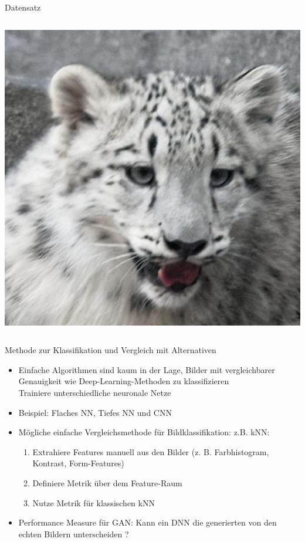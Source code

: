 \documentclass[aspectratio=1610, 9pt]{beamer}
\begin{document}
\begin{frame}{Datensatz}
\begin{columns}
    \includegraphics[scale=0.13]{images/wildlife.jpg}\\

  \end{columns}
\end{frame}

\begin{frame}{Methode zur Klassifikation und Vergleich mit Alternativen}
  \begin{itemize}
    \item Einfache Algorithmen sind kaum in der Lage, Bilder mit vergleichbarer Genauigkeit wie Deep-Learning-Methoden zu klassifizieren\\
    \rightarrow{} Trainiere unterschiedliche neuronale Netze
    \item Beispiel: Flaches NN, Tiefes NN und CNN
    \item Mögliche einfache Vergleichsmethode für Bildklassifikation: z.B. kNN:
    \begin{enumerate}
      \item Extrahiere Features manuell aus den Bilder (z. B. Farbhistogram, Kontrast, Form-Features)
      \item Definiere Metrik über dem Feature-Raum
      \item Nutze Metrik für klassischen kNN
    \end{enumerate}
    \item Performance Measure für GAN: Kann ein DNN die generierten von den echten Bildern unterscheiden ?
  \end{itemize}

\end{frame}
\end{document}
